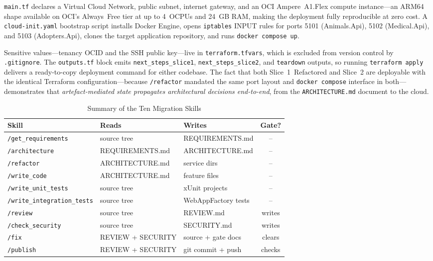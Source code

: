 \documentclass[10pt,journal,compsoc]{IEEEtran}
\begin{document}
\texttt{main.tf} declares a Virtual Cloud Network, public subnet,
internet gateway, and an OCI Ampere~A1.Flex compute instance—an
ARM64 shape available on OCI's Always~Free tier at up to 4~OCPUs and
24~GB RAM, making the deployment fully reproducible at zero cost.
A \texttt{cloud-init.yaml} bootstrap script installs Docker Engine,
opens \texttt{iptables} INPUT rules for ports 5101 (Animals.Api),
5102 (Medical.Api), and 5103 (Adopters.Api), clones the target
application repository, and runs \texttt{docker~compose~up}.

Sensitive values—tenancy OCID and the SSH public key—live in
\texttt{terraform.tfvars}, which is excluded from version control
by \texttt{.gitignore}.  The \texttt{outputs.tf} block emits
\texttt{next\_steps\_slice1}, \texttt{next\_steps\_slice2}, and
\texttt{teardown} outputs, so running \texttt{terraform~apply}
delivers a ready-to-copy deployment command for either codebase.
The fact that both Slice~1~Refactored and Slice~2 are deployable
with the identical Terraform configuration—because \texttt{/refactor}
mandated the same port layout and \texttt{docker~compose} interface
in both—demonstrates that \emph{artefact-mediated state propagates
architectural decisions end-to-end}, from the \texttt{ARCHITECTURE.md}
document to the cloud.

\begin{table}[!t]
  \caption{Summary of the Ten Migration Skills}
  \label{tab:skills}
  \centering
  \small
  \setlength{\tabcolsep}{4pt}
  \begin{tabular}{@{}lllc@{}}
    \toprule
    \textbf{Skill} & \textbf{Reads} & \textbf{Writes} & \textbf{Gate?} \\
    \midrule
    \texttt{/get\_requirements}         & source tree       & REQUIREMENTS.md     & --     \\
    \texttt{/architecture}              & REQUIREMENTS.md   & ARCHITECTURE.md     & --     \\
    \texttt{/refactor}                  & ARCHITECTURE.md   & service dirs        & --     \\
    \texttt{/write\_code}               & ARCHITECTURE.md   & feature files       & --     \\
    \texttt{/write\_unit\_tests}        & source tree       & xUnit projects      & --     \\
    \texttt{/write\_integration\_tests} & source tree       & WebAppFactory tests & --     \\
    \texttt{/review}                    & source tree       & REVIEW.md           & writes \\
    \texttt{/check\_security}           & source tree       & SECURITY.md         & writes \\
    \texttt{/fix}                       & REVIEW + SECURITY & source + gate docs  & clears \\
    \texttt{/publish}                   & REVIEW + SECURITY & git commit + push   & checks \\
    \bottomrule
  \end{tabular}
\end{table}
\end{document}
